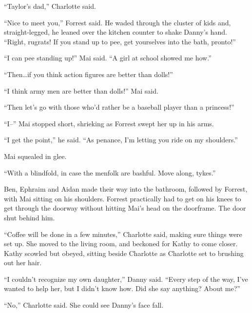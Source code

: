 ``Taylor's dad,'' Charlotte said.



``Nice to meet you,'' Forrest said.  He waded through the cluster of kids and, straight-legged, he leaned over the kitchen counter to shake Danny's hand.  ``Right, rugrats!  If you stand up to pee, get yourselves into the bath, pronto!''



``I can pee standing up!'' Mai said.  ``A girl at school showed me how.''



``Then\ldots if you think action figures are better than dolls!''



``I think army men are better than dolls!'' Mai said.



``Then let's go with those who'd rather be a baseball player than a princess!''



``I--''  Mai stopped short, shrieking as Forrest swept her up in his arms.



``I get the point,'' he said.  ``As penance, I'm letting you ride on my shoulders.''



Mai squealed in glee.



``With a blindfold, in case the menfolk are bashful.  Move along, tykes.''



Ben, Ephraim and Aidan made their way into the bathroom, followed by Forrest, with Mai sitting on his shoulders.  Forrest practically had to get on his knees to get through the doorway without hitting Mai's head on the doorframe.  The door shut behind him.



``Coffee will be done in a few minutes,'' Charlotte said, making sure things were set up.  She moved to the living room, and beckoned for Kathy to come closer.  Kathy scowled but obeyed, sitting beside Charlotte as Charlotte set to brushing out her hair.



``I couldn't recognize my own daughter,'' Danny said.  ``Every step of the way, I've wanted to help her, but I didn't know how.  Did she say anything?  About me?''



``No,'' Charlotte said.  She could see Danny's face fall.



